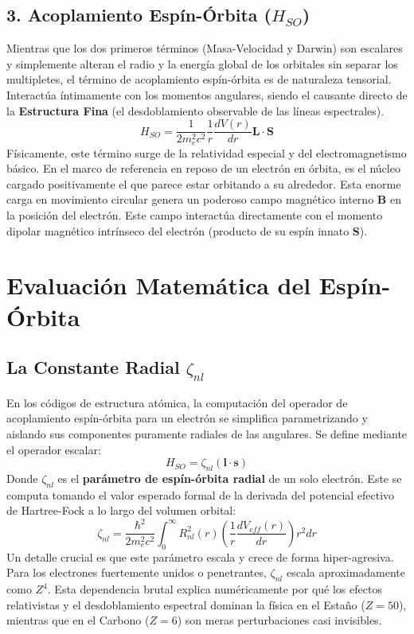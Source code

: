 \documentclass[11pt,a4paper]{article}
\begin{document}
\subsection{3. Acoplamiento Espín-Órbita ($H_{SO}$)}
Mientras que los dos primeros términos (Masa-Velocidad y Darwin) son escalares y simplemente alteran el radio y la energía global de los orbitales sin separar los multipletes, el término de acoplamiento espín-órbita es de naturaleza tensorial. Interactúa íntimamente con los momentos angulares, siendo el causante directo de la \textbf{Estructura Fina} (el desdoblamiento observable de las líneas espectrales).
\begin{equation}
H_{SO} = \frac{1}{2m_e^2 c^2} \frac{1}{r} \frac{dV(r)}{dr} \mathbf{L} \cdot \mathbf{S}
\end{equation}
Físicamente, este término surge de la relatividad especial y del electromagnetismo básico. En el marco de referencia en reposo de un electrón en órbita, es el núcleo cargado positivamente el que parece estar orbitando a su alrededor. Esta enorme carga en movimiento circular genera un poderoso campo magnético interno $\mathbf{B}$ en la posición del electrón. Este campo interactúa directamente con el momento dipolar magnético intrínseco del electrón (producto de su espín innato $\mathbf{S}$).

\section{Evaluación Matemática del Espín-Órbita}

\subsection{La Constante Radial $\zeta_{nl}$}
En los códigos de estructura atómica, la computación del operador de acoplamiento espín-órbita para un electrón se simplifica parametrizando y aislando sus componentes puramente radiales de las angulares. Se define mediante el operador escalar:
\begin{equation}
H_{SO} = \zeta_{nl} (\mathbf{l} \cdot \mathbf{s})
\end{equation}
Donde $\zeta_{nl}$ es el \textbf{parámetro de espín-órbita radial} de un solo electrón. Este se computa tomando el valor esperado formal de la derivada del potencial efectivo de Hartree-Fock a lo largo del volumen orbital:
\begin{equation}
\zeta_{nl} = \frac{\hbar^2}{2 m_e^2 c^2} \int_0^\infty R_{nl}^2(r) \left( \frac{1}{r} \frac{dV_{eff}(r)}{dr} \right) r^2 dr
\end{equation}
Un detalle crucial es que este parámetro escala y crece de forma hiper-agresiva. Para los electrones fuertemente unidos o penetrantes, $\zeta_{nl}$ escala aproximadamente como $Z^4$. Esta dependencia brutal explica numéricamente por qué los efectos relativistas y el desdoblamiento espectral dominan la física en el Estaño ($Z=50$), mientras que en el Carbono ($Z=6$) son meras perturbaciones casi invisibles.
\end{document}
